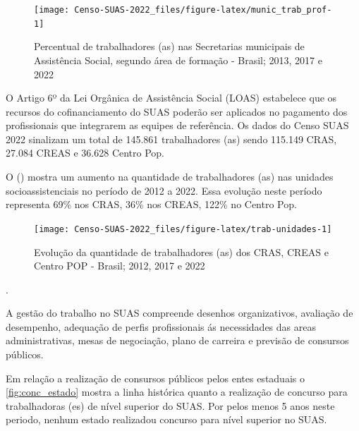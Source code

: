 \documentclass[
  brazilian]{report}
\begin{document}
\begin{figure}
\texttt{[image: Censo-SUAS-2022\_files/figure-latex/munic\_trab\_prof-1]} \caption[Percentual de trabalhadores (as) nas Secretarias municipais de Assistência Social, segundo área de formação - Brasil]{Percentual de trabalhadores (as) nas Secretarias municipais de Assistência Social, segundo área de formação - Brasil; 2013, 2017 e 2022}\label{fig:munic_trab_prof}
\end{figure}

O Artigo 6º da Lei Orgânica de Assistência Social (LOAS) estabelece que
os recursos do cofinanciamento do SUAS poderão ser aplicados no
pagamento dos profissionais que integrarem as equipes de referência. Os
dados do Censo SUAS 2022 sinalizam um total de 145.861 trabalhadores
(as) sendo 115.149 CRAS, 27.084 CREAS e 36.628 Centro Pop.

O () mostra um aumento na quantidade de
trabalhadores (as) nas unidades socioassistenciais no período de 2012 a
2022. Essa evolução neste período representa 69\% nos CRAS, 36\% nos
CREAS, 122\% no Centro Pop.

\begin{figure}
\texttt{[image: Censo-SUAS-2022\_files/figure-latex/trab-unidades-1]} \caption[Evolução da quantidade de trabalhadores (as) dos CRAS, CREAS e Centro POP - Brasil]{Evolução da quantidade de trabalhadores (as) dos CRAS, CREAS e Centro POP - Brasil; 2012, 2017 e 2022}\label{fig:trab-unidades}
\end{figure}

.

A gestão do trabalho no SUAS compreende desenhos organizativos,
avaliação de desempenho, adequação de perfis profissionais ás
necessidades das areas administrativas, mesas de negociação, plano de
carreira e previsão de consursos públicos.

Em relação a realização de consursos públicos pelos entes estaduais o
\cref{fig:conc_estado} mostra a linha histórica quanto a realização de
concurso para trabalhadoras (es) de nível superior do SUAS. Por pelos
menos 5 anos neste periodo, nenhum estado realizadou concurso para nível
superior no SUAS.
\end{document}
